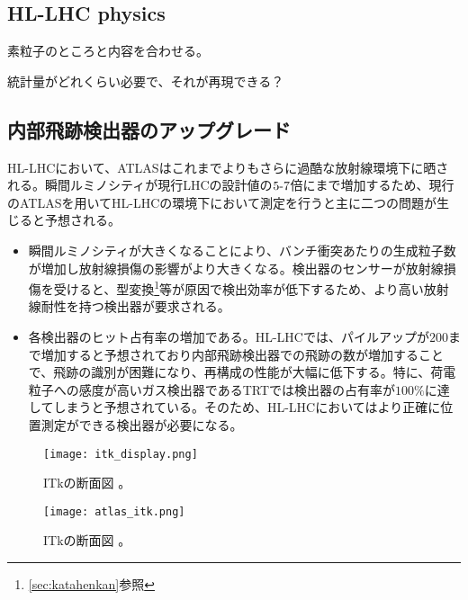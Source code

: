 \subsection{HL-LHC physics}
\label{sec:hl-lhc-physics}

素粒子のところと内容を合わせる。

統計量がどれくらい必要で、それが再現できる？


\subsection{内部飛跡検出器のアップグレード}
\label{sec:hl-lhc-itk}
HL-LHCにおいて、ATLASはこれまでよりもさらに過酷な放射線環境下に晒される。瞬間ルミノシティが現行LHCの設計値の$5 \mathchar`- 7$倍にまで増加するため、現行のATLASを用いてHL-LHCの環境下において測定を行うと主に二つの問題が生じると予想される。
\begin{itemize}
\item 瞬間ルミノシティが大きくなることにより、バンチ衝突あたりの生成粒子数が増加し放射線損傷の影響がより大きくなる。検出器のセンサーが放射線損傷を受けると、型変換\footnote{\ref{sec:katahenkan}参照}等が原因で検出効率が低下するため、より高い放射線耐性を持つ検出器が要求される。
\item 各検出器のヒット占有率の増加である。HL-LHCでは、パイルアップが$200$まで増加すると予想されており内部飛跡検出器での飛跡の数が増加することで、飛跡の識別が困難になり、再構成の性能が大幅に低下する。特に、荷電粒子への感度が高いガス検出器であるTRTでは検出器の占有率が$100\si{\%}$に達してしまうと予想されている。そのため、HL-LHCにおいてはより正確に位置測定ができる検出器が必要になる。
\end{itemize}

\begin{figure}[tbp]
  \centering
  \texttt{[image: itk\_display.png]}
  \caption[ITkの断面図]{ITkの断面図 \cite{itk}。}
  \label{fig:hl-lhc-itk}
\end{figure}

\begin{figure}[tbp]
  \centering
  \texttt{[image: atlas\_itk.png]}
  \caption[ITkの断面図]{ITkの断面図 \cite{itk}。}
  \label{fig:itk-danmen}
\end{figure}

